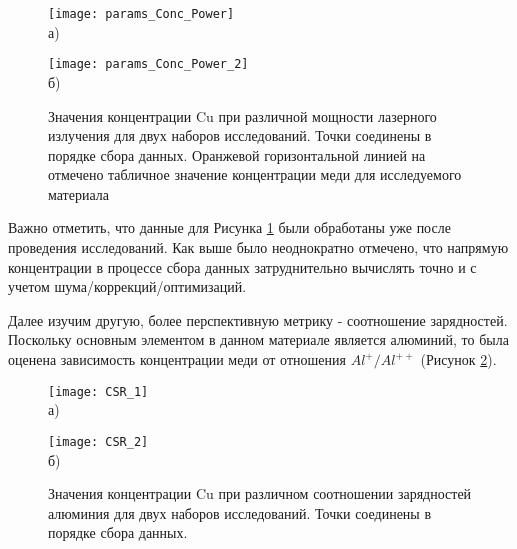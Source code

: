 \begin{figure}[htb]
	\begin{minipage}[b]{0.49\textwidth}\centering
		\texttt{[image: params\_Conc\_Power]} \\ а)
	\end{minipage}
	\begin{minipage}[b]{0.49\textwidth}\centering
		\texttt{[image: params\_Conc\_Power\_2]} \\ б)
	\end{minipage}
	\caption{Значения концентрации Cu при различной мощности лазерного излучения для двух наборов исследований. Точки соединены в порядке сбора данных. Оранжевой горизонтальной линией на отмечено табличное значение концентрации меди для исследуемого материала}
	\label{fig:params_Conc_Power}
\end{figure}

\FloatBarrier

Важно отметить, что данные для Рисунка \cref{fig:params_Conc_Power} были обработаны уже после проведения исследований. Как выше было неоднократно отмечено, что напрямую концентрации в процессе сбора данных затруднительно вычислять точно и с учетом шума/коррекций/оптимизаций.

Далее изучим другую, более перспективную метрику - соотношение зарядностей. Поскольку основным элементом в данном материале является алюминий, то была оценена зависимость концентрации меди от отношения $Al^{+}/Al^{++}$ (Рисунок \cref{fig:params_Conc_CSR}).

\begin{figure}[htb]
	\begin{minipage}[b]{0.49\textwidth}\centering
		\texttt{[image: CSR\_1]} \\ а)
	\end{minipage}
	\begin{minipage}[b]{0.49\textwidth}\centering
		\texttt{[image: CSR\_2]} \\ б)
	\end{minipage}
	\caption{Значения концентрации Cu при различном соотношении зарядностей алюминия для двух наборов исследований. Точки соединены в порядке сбора данных.}
	\label{fig:params_Conc_CSR}
\end{figure}


